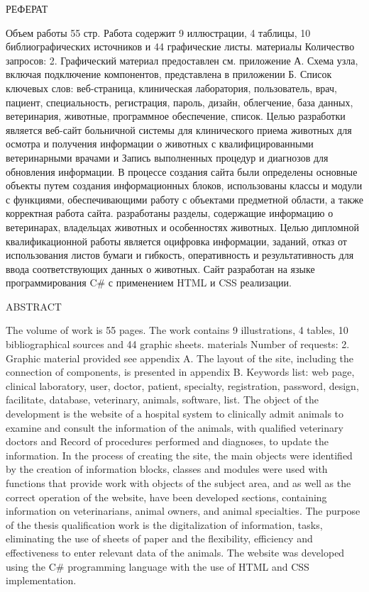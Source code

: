 \newpage
\begin{center}
  РЕФЕРАТ
\end{center}

Объем работы 55 стр. Работа содержит 9 иллюстрации, 4 таблицы, 10 библиографических источников и 44 графические листы.
материалы Количество запросов: 2. Графический материал предоставлен
см. приложение А. Схема узла, включая подключение компонентов, представлена ​​в приложении Б.
Список ключевых слов: веб-страница, клиническая лаборатория, пользователь, врач, пациент, специальность, регистрация, пароль, дизайн, облегчение, база данных, ветеринария, животные, программное обеспечение, список.
Целью разработки является веб-сайт больничной системы для клинического приема животных для осмотра и получения информации о животных с квалифицированными ветеринарными врачами и
Запись выполненных процедур и диагнозов для обновления информации.
В процессе создания сайта были определены основные объекты путем создания информационных блоков, использованы классы и модули с функциями, обеспечивающими работу с объектами предметной области, а также корректная работа сайта. разработаны разделы, содержащие информацию о ветеринарах, владельцах животных и особенностях животных.
Целью дипломной квалификационной работы является оцифровка информации, заданий, отказ от использования листов бумаги и гибкость, оперативность и результативность для ввода соответствующих данных о животных.
Сайт разработан на языке программирования C\# с применением HTML и CSS реализации.


\newpage
{}
\begin{center}ABSTRACT\end{center}
  

The volume of work is 55 pages. The work contains 9 illustrations, 4 tables, 10 bibliographical sources and 44 graphic sheets.
materials Number of requests: 2. Graphic material provided
see appendix A. The layout of the site, including the connection of components, is presented in appendix B.
Keywords list: web page, clinical laboratory, user, doctor, patient, specialty, registration, password, design, facilitate, database, veterinary, animals, software, list.
The object of the development is the website of a hospital system to clinically admit animals to examine and consult the information of the animals, with qualified veterinary doctors and
Record of procedures performed and diagnoses, to update the information.
In the process of creating the site, the main objects were identified by the creation of information blocks, classes and modules were used with functions that provide work with objects of the subject area, and as well as the correct operation of the website, have been developed sections, containing information on veterinarians, animal owners, and animal specialties.
The purpose of the thesis qualification work is the digitalization of information, tasks, eliminating the use of sheets of paper and the flexibility, efficiency and effectiveness to enter relevant data of the animals.
The website was developed using the C\# programming language with the use of HTML and CSS implementation.
